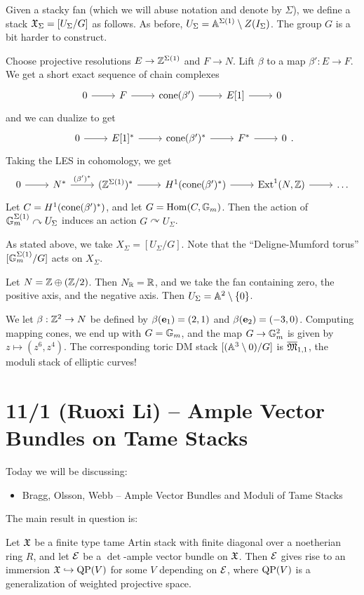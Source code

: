 \documentclass{amsart}
\begin{document}
Given a stacky fan (which we will abuse notation and denote by $\Sigma$), we define a stack $\Xfr_\Sigma = [U_\Sigma / G]$ as follows.
As before, $U_\Sigma = \AA^{\Sigma(1)} \setminus Z(I_\Sigma)$.
The group $G$ is a bit harder to construct.

Choose projective resolutions $E \to \ZZ^{\Sigma(1)}$ and $F \to N$.
Lift $\beta$ to a map $\beta': E \to F$.
We get a short exact sequence of chain complexes
\[
	\SES{F}{\cone(\beta')}{E[1]}
\]
and we can dualize to get
\[
	\SES{E[1]^*}{\cone(\beta')^*}{F^*}.
\]
Taking the LES in cohomology, we get
\[
	\begin{tikzcd}
		0 \rar & N^* \rar["(\beta')^*"] & (\ZZ^{\Sigma(1)})^* \rar & H^1(\cone(\beta')^*) \rar & \Ext^1(N, \ZZ) \rar & \dots
	\end{tikzcd}
\]
Let $C = H^1(\cone(\beta')^*)$, and let $G = \Hom(C, \GG_m)$.
Then the action of $\GG_m^{\Sigma(1)} \curvearrowright U_\Sigma$ induces an action $G \curvearrowright U_\Sigma$.

As stated above, we take $X_\Sigma = [U_\Sigma / G]$.
Note that the ``Deligne-Mumford torus'' $[\GG_m^{\Sigma(1)} / G]$ acts on $X_\Sigma$.

\begin{ex}
	Let $N = \ZZ \oplus (\ZZ / 2)$.
	Then $N_\RR = \RR$, and we take the fan containing zero, the positive axis, and the negative axis.
	Then $U_\Sigma = \AA^2 \setminus \{ 0 \}$.
	
	We let $\beta: \ZZ^2 \to N$ be defined by $\beta(\ebf_1) = (2, 1)$ and $\beta(\ebf_2) = (-3, 0)$.
	Computing mapping cones, we end up with $G = \GG_m$, and the map $G \to \GG_m^2$ is given by $z \mapsto (z^6, z^4)$.
	The corresponding toric DM stack $[(\AA^3 \setminus 0) / G]$ is $\ol{\Mfr}_{1,1}$, the moduli stack of elliptic curves!
\end{ex}

\section{11/1 (Ruoxi Li) -- Ample Vector Bundles on Tame Stacks}

Today we will be discussing:
\begin{itemize}
	\item Bragg, Olsson, Webb -- Ample Vector Bundles and Moduli of Tame Stacks
\end{itemize}

The main result in question is:

\begin{thm}
	Let $\Xfr$ be a finite type tame Artin stack with finite diagonal over a noetherian ring $R$, and let $\Ec$ be a $\det$-ample vector bundle on $\Xfr$.
	Then $\Ec$ gives rise to an immersion $\Xfr \hookrightarrow \QP(V)$ for some $V$ depending on $\Ec$, where $\QP(V)$ is a generalization of weighted projective space.
\end{thm}
\end{document}
